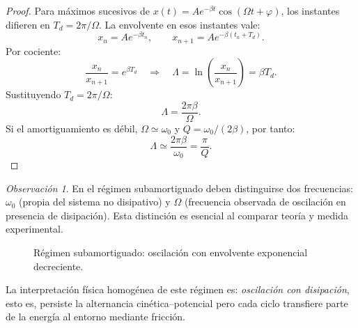 \documentclass[12pt, a4paper]{article}
\theoremstyle{plain}
\theoremstyle{definition}
\theoremstyle{remark}
\newtheorem*{observacion}{Observación}
\begin{document}
\begin{proof}
Para máximos sucesivos de
$x(t)=A e^{-\beta t}\cos(\Omega t+\varphi)$, los instantes difieren en
$T_d=2\pi/\Omega$. La envolvente en esos instantes vale:
\begin{equation}
  x_n=Ae^{-\beta t_n},\qquad
  x_{n+1}=Ae^{-\beta(t_n+T_d)}.
\end{equation}
Por cociente:
\begin{equation}
  \frac{x_n}{x_{n+1}}=e^{\beta T_d}
  \quad\Rightarrow\quad
  \Lambda=\ln\!\left(\frac{x_n}{x_{n+1}}\right)=\beta T_d.
\end{equation}
Sustituyendo $T_d=2\pi/\Omega$:
\begin{equation}
  \Lambda=\frac{2\pi\beta}{\Omega}.
\end{equation}
Si el amortiguamiento es débil, $\Omega\simeq\omega_0$ y
$Q=\omega_0/(2\beta)$, por tanto:
\begin{equation}
  \Lambda\simeq\frac{2\pi\beta}{\omega_0}=\frac{\pi}{Q}.
\end{equation}
\end{proof}
\begin{observacion}
En el régimen subamortiguado deben distinguirse dos frecuencias:
$\omega_0$ (propia del sistema no disipativo) y $\Omega$ (frecuencia observada de
oscilación en presencia de disipación). Esta distinción es esencial al comparar teoría y
medida experimental.
\end{observacion}

\begin{figure}[H]
  \centering
  \caption{Régimen subamortiguado: oscilación con envolvente exponencial decreciente.}
\end{figure}

La interpretación física homogénea de este régimen es: \emph{oscilación con disipación},
esto es, persiste la alternancia cinética--potencial pero cada ciclo transfiere parte de la
energía al entorno mediante fricción.
\end{document}

